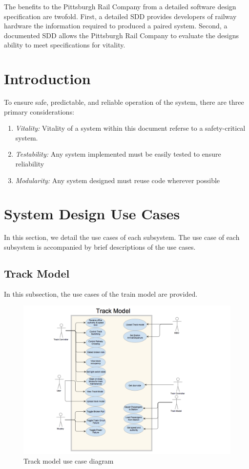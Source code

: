 \documentclass[]{article}
\begin{document}
The benefits to the Pittsburgh Rail Company from  a detailed software design specification are twofold. First, a detailed SDD provides developers of railway hardware the information required to produced a paired system. Second, a documented SDD allows the Pittsburgh Rail Company to evaluate the designs ability to meet specifications for vitality.

\section{Introduction}
To ensure safe, predictable, and reliable operation of the system, there are three primary considerations:
\begin{enumerate}
	\item \emph{Vitality:} Vitality of a system within this document referse to a safety-critical system.
	\item \emph{Testability:} Any system implemented must be easily tested to ensure reliability
	\item \emph{Modularity:} Any system designed must reuse code wherever possible
\end{enumerate}

\section{System Design Use Cases}
In this section, we detail the use cases of each subsystem. The use case of each subsystem is accompanied by brief descriptions of the use cases.

\subsection{Track Model}
In this subsection, the use cases of the train model are provided.

\begin{figure}[H]
	\centering
	\includegraphics[scale=.15]{trackmodelusecase.png}
	\caption{Track model use case diagram}
\end{figure}
\end{document}
